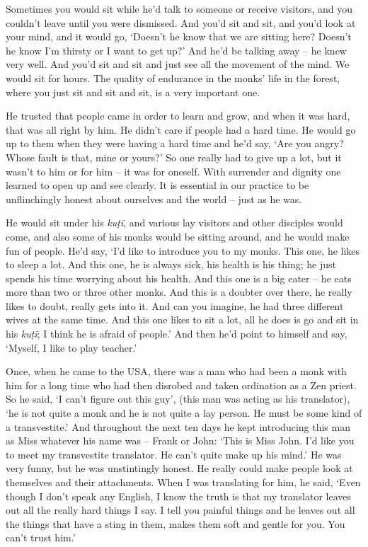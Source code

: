 Sometimes you would sit while he'd talk to someone or receive visitors, 
and you couldn't leave until you were dismissed. And you'd sit and sit, 
and you'd look at your mind, and it would go, `Doesn't he know that we
are sitting here? Doesn't he know I'm thirsty or I want to get up?' And
he'd be talking away -- he knew very well. And you'd sit and sit and
just see all the movement of the mind. We would sit for hours. The
quality of endurance in the monks' life in the forest, where you just
sit and sit and sit, is a very important one. 

He trusted that people came in order to learn and grow, and when it was
hard, that was all right by him. He didn't care if people had a hard
time. He would go up to them when they were having a hard time and he'd
say, `Are you angry? Whose fault is that, mine or yours?' So one really
had to give up a lot, but it wasn't to him or for him -- it was for
oneself. With surrender and dignity one learned to open up and see
clearly. It is essential in our practice to be unflinchingly honest
about ourselves and the world -- just as he was. 

He would sit under his \emph{kuṭī}, and various lay visitors and other
disciples would come, and also some of his monks would be sitting
around, and he would make fun of people. He'd say, `I'd like to
introduce you to my monks. This one, he likes to sleep a lot. And this
one, he is always sick, his health is his thing; he just spends his time
worrying about his health. And this one is a big eater -- he eats more
than two or three other monks. And this is a doubter over there, he
really likes to doubt, really gets into it. And can you imagine, he had
three different wives at the same time. And this one likes to sit a lot, 
all he does is go and sit in his \emph{kuṭī}; I think he is afraid of
people.' And then he'd point to himself and say, `Myself, I like to play
teacher.'

Once, when he came to the USA, there was a man who had been a monk with
him for a long time who had then disrobed and taken ordination as a Zen
priest. So he said, `I can't figure out this guy', (this man was acting
as his translator), `he is not quite a monk and he is not quite a lay
person. He must be some kind of a transvestite.' And throughout the next
ten days he kept introducing this man as Miss whatever his name was --
Frank or John: `This is Miss John. I'd like you to meet my
transvestite translator. He can't quite make up his mind.' He was very
funny, but he was unstintingly honest. He really could make people look
at themselves and their attachments. When I was translating for him, he
said, `Even though I don't speak any English, I know the truth is that
my translator leaves out all the really hard things I say. I tell you
painful things and he leaves out all the things that have a sting in
them, makes them soft and gentle for you. You can't trust him.'

